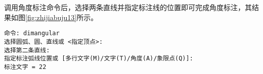 \begin{procedure}
\begin{enumerate}
调用角度标注命令后，选择两条直线并指定标注线的位置即可完成角度标注，其结果如图\ref{fig:zhijiabuju13}所示。

\begin{lstlisting}
命令: dimangular
选择圆弧、圆、直线或 <指定顶点>:
选择第二条直线:
指定标注弧线位置或 [多行文字(M)/文字(T)/角度(A)/象限点(Q)]:
标注文字 = 22
\end{lstlisting}

\end{enumerate}

\end{procedure}
\endinput